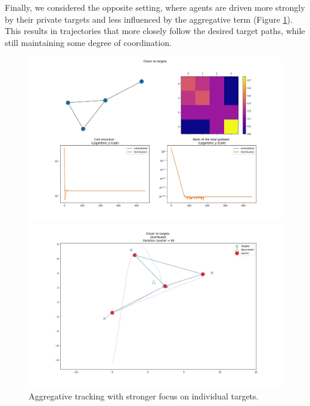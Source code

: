 Finally, we considered the opposite setting, where agents are driven more strongly by their private targets and less influenced by the aggregative term (Figure \ref{fig:closer_target}). This results in trajectories that more closely follow the desired target paths, while still maintaining some degree of coordination.

\begin{figure}[h!]
  \begin{minipage}{0.50\textwidth}
    \includegraphics[width=\linewidth]{report/figs/Closer_to_targets.png}
  \end{minipage}%
  \hfill
  \begin{minipage}{0.50\textwidth}
    \includegraphics[width=\linewidth]{report/figs/Closer_to_targets_Distributed.png}
  \end{minipage}
  \caption{Aggregative tracking with stronger focus on individual targets.}
  \label{fig:closer_target}
\end{figure}

